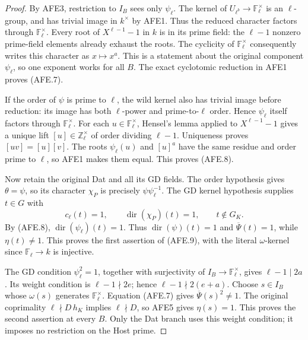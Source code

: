 \documentclass[11pt,a4paper]{article}
\numberwithin{equation}{section}
\theoremstyle{remark}\newtheorem{remark}[theorem]{Remark}
\begin{document}
\begin{proof}
By AFE3, restriction to \(I_B\) sees only \(\psi_\ell\).
The kernel of \(U_{\ell^b}\to\mathbb F_\ell^\times\)
is an \(\ell\)-group, and has trivial image in \(k^\times\)
by AFE1.  Thus the reduced character factors through
\(\mathbb F_\ell^\times\).  Every root of
\(X^{\ell-1}-1\) in \(k\) is in its prime field:
the \(\ell-1\) nonzero prime-field elements already
exhaust the roots.  The cyclicity of
\(\mathbb F_\ell^\times\) consequently writes this
character as \(x\mapsto x^a\).
This is a statement about the original component
\(\psi_\ell\), so one exponent works for all \(B\).
The exact cyclotomic reduction in AFE1 proves (AFE.7).

If the order of \(\psi\) is prime to \(\ell\), the wild
kernel also has trivial image before reduction:
its image has both \(\ell\)-power and prime-to-\(\ell\)
order.  Hence \(\psi_\ell\) itself factors through
\(\mathbb F_\ell^\times\).
For each \(u\in\mathbb F_\ell^\times\), Hensel's lemma
applied to \(X^{\ell-1}-1\) gives a unique lift
\([u]\in\mathbb Z_\ell^\times\) of order dividing
\(\ell-1\).  Uniqueness proves \([uv]=[u][v]\).
The roots \(\psi_\ell(u)\) and \([u]^a\) have the same
residue and order prime to \(\ell\), so AFE1 makes
them equal.  This proves (AFE.8).

Now retain the original Dat and all its GD fields.
The order hypothesis gives \(\theta=\psi\), so its
character \(\chi_P\) is precisely
\(\psi\psi_\ell^{-1}\).
The GD kernel hypothesis supplies \(t\in G\) with
\[
      c_\ell(t)=1,\qquad
      \operatorname{dir}(\chi_P)(t)=1,\qquad
      t\notin G_K.
 \]
By (AFE.8), \(\operatorname{dir}(\psi_\ell)(t)=1\).
Thus \(\operatorname{dir}(\psi)(t)=1\) and
\(\overline\Psi(t)=1\), while
\(\eta(t)\ne1\).  This proves the first assertion
of (AFE.9), with the literal \(\omega\)-kernel since
\(\mathbb F_\ell\to k\) is injective.

The GD condition \(\psi_\ell^2=1\), together with
surjectivity of \(I_B\to\mathbb F_\ell^\times\), gives
\(\ell-1\mid2a\).
Its weight condition is \(\ell-1\nmid2e\); hence
\(\ell-1\nmid2(e+a)\).
Choose \(s\in I_B\) whose \(\omega(s)\) generates
\(\mathbb F_\ell^\times\).  Equation (AFE.7) gives
\(\overline\Psi(s)^2\ne1\).
The original coprimality
\(\ell\nmid D\,h_K\) implies \(\ell\nmid D\),
so AFE5 gives \(\eta(s)=1\).
This proves the second assertion at every \(B\).
Only the Dat branch uses this weight condition;
it imposes no restriction on the Host prime.
\end{proof}
\end{document}
